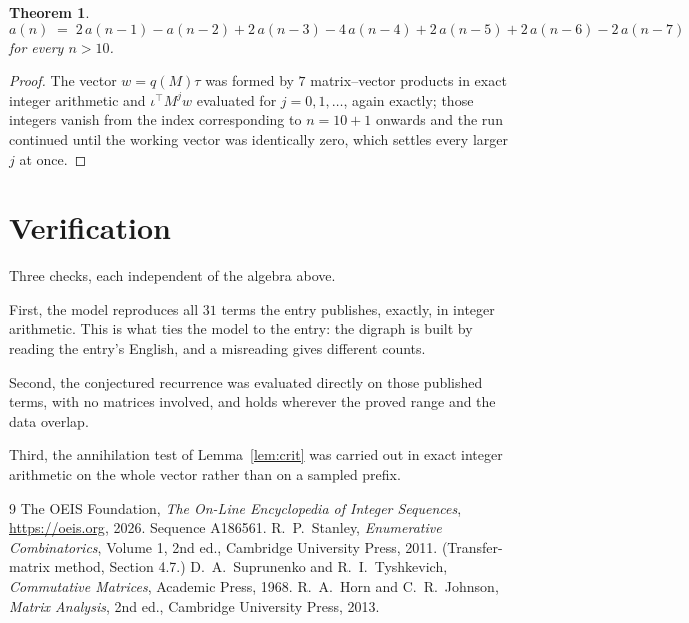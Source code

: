 \documentclass[11pt,a4paper]{article}
\theoremstyle{plain}
\newtheorem{theorem}{Theorem}
\theoremstyle{definition}
\begin{document}
\begin{theorem}
\[
a(n)\;=\;2\,a(n-1) - a(n-2) + 2\,a(n-3) - 4\,a(n-4) + 2\,a(n-5) + 2\,a(n-6) - 2\,a(n-7)
\]
for every $n>10$.
\end{theorem}

\begin{proof}
The vector $w=q(M)\tau$ was formed by $7$ matrix--vector products in exact integer
arithmetic and $\iota^{\!\top}M^{j}w$ evaluated for $j=0,1,\dots$, again exactly; those
integers vanish from the index corresponding to $n=10+1$ onwards and the run continued
until the working vector was identically zero, which settles every larger $j$ at once.
\end{proof}

\section{Verification}

Three checks, each independent of the algebra above.

First, the model reproduces all $31$ terms the entry publishes, exactly, in integer
arithmetic. This is what ties the model to the entry: the digraph is built by reading the
entry's English, and a misreading gives different counts.

Second, the conjectured recurrence was evaluated directly on those published terms, with no
matrices involved, and holds wherever the proved range and the data overlap.

Third, the annihilation test of Lemma~\ref{lem:crit} was carried out in exact integer
arithmetic on the whole vector rather than on a sampled prefix.

\begin{thebibliography}{9}
 The OEIS Foundation, \emph{The On-Line Encyclopedia of Integer
Sequences}, \url{https://oeis.org}, 2026. Sequence A186561.
 R.~P.~Stanley, \emph{Enumerative Combinatorics}, Volume 1, 2nd ed.,
Cambridge University Press, 2011. (Transfer-matrix method, Section 4.7.)
 D.~A.~Suprunenko and R.~I.~Tyshkevich, \emph{Commutative Matrices},
Academic Press, 1968.
 R.~A.~Horn and C.~R.~Johnson, \emph{Matrix Analysis}, 2nd ed., Cambridge
University Press, 2013.
\end{thebibliography}
\end{document}
